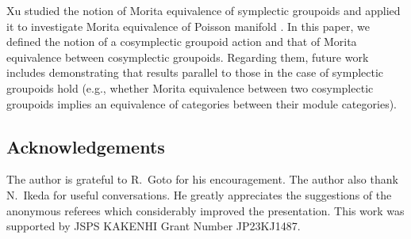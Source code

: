 \documentclass[pdftex]{sigma}
\numberwithin{equation}{section}
\begin{document}
Xu \cite{xu2} studied the notion of Morita equivalence of symplectic groupoids and applied it to investigate Morita equivalence of Poisson manifold \cite{xu1}. In this paper, we defined the notion of a cosymplectic groupoid action and that of Morita equivalence between cosymplectic groupoids. Regarding them, future work includes demonstrating that results parallel to those in the case of symplectic groupoids hold (e.g., whether Morita equivalence between two cosymplectic groupoids implies an equivalence of categories between their module categories).

\subsection*{Acknowledgements}

The author is grateful to R.~Goto for his encouragement. The author also thank N.~Ikeda for useful conversations. He greatly appreciates the suggestions of the anonymous referees which considerably improved the presentation. This work was supported by JSPS KAKENHI Grant Number JP23KJ1487.
\end{document}
